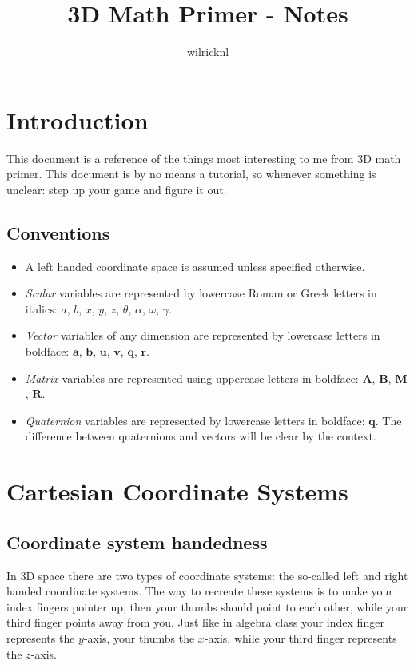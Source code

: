 \documentclass[a4paper,11pt]{article}
\author{wilricknl}
\title{3D Math Primer - Notes}
\begin{document}
\maketitle

\newpage
\tableofcontents

\newpage
\section{Introduction}

This document is a reference of the things most interesting to me from 3D math primer. This document is by no means a tutorial, so whenever something is unclear: step up your game and figure it out.

\subsection{Conventions}

\begin{itemize}
\item A left handed coordinate space is assumed unless specified otherwise.
\item \textit{Scalar} variables are represented by lowercase Roman or Greek letters in italics: $a$, $b$, $x$, $y$, $z$, $\theta$,
  $\alpha$, $\omega$, $\gamma$.
\item
  \textit{Vector} variables of any dimension are represented by lowercase
  letters in boldface: $\mathbf{a}$, $\mathbf{b}$, $\mathbf{u}$, $\mathbf{v}$, $\mathbf{q}$, $\mathbf{r}$.
\item \textit{Matrix} variables are represented using uppercase letters in
  boldface: $\mathbf{A}$, $\mathbf{B}$, $\mathbf{M}$, $\mathbf{R}$.
 \item \textit{Quaternion} variables are represented by lowercase letters in boldface: $\textbf{q}$. The difference between quaternions and vectors will be clear by the context.
\end{itemize}

\newpage
\section{Cartesian Coordinate Systems}

\subsection{Coordinate system handedness}

In 3D space there are two types of coordinate systems: the so-called left and right handed coordinate systems. The way to recreate these systems is to make your index fingers pointer up, then your thumbs should point to each other, while your third finger points away from you. Just like in algebra class your index finger represents the $y$-axis, your thumbs the $x$-axis, while your third finger represents the $z$-axis.
\end{document}

